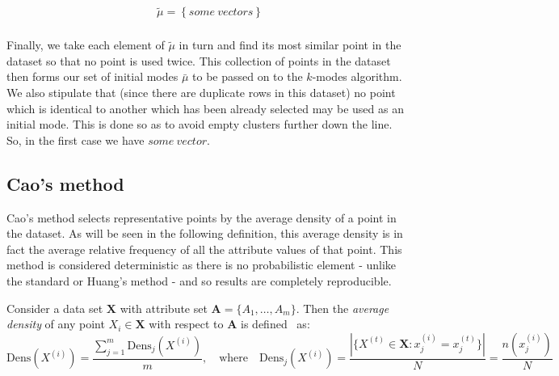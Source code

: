 \begin{example}
    \begin{equation}
    \nonumber
    \begin{aligned}
        \tilde{\mu} = \left\{some \ vectors \right\}\\
    \end{aligned}
    \end{equation}

    Finally, we take each element of \(\tilde{\mu}\) in turn and find its most
    similar point in the dataset so that no point is used twice. This collection
    of points in the dataset then forms our set of initial modes \(\bar{\mu}\)
    to be passed on to the \(k\)-modes algorithm. We also stipulate that (since
    there are duplicate rows in this dataset) no point which is identical to
    another which has been already selected may be used as an initial mode. This
    is done so as to avoid empty clusters further down the line.\\

    So, in the first case we have \(some \ vector\).

\end{example}

\subsection{Cao's method}\label{subsec:cao}

Cao's method selects representative points by the average density of a point in
the dataset. As will be seen in the following definition, this average density 
is in fact the average relative frequency of all the attribute values of that 
point. This method is considered deterministic as there is no probabilistic 
element - unlike the standard or Huang's method - and so results are completely
reproducible.\\

\begin{definition}\label{def:density}	
    Consider a data set \(\textbf{X}\) with attribute set \(\textbf{A} = 
    \{A_1, \ldots, A_m\}\). Then the \emph{average density} of any point 
    \(X_i \in \textbf{X}\) with respect to \(\textbf{A}\) is 
    defined~\cite{Cao09} as:
	\[
	    \text{Dens}(X^{(i)}) = \frac{\sum_{j=1}^m \text{Dens}_{j}(X^{(i)})}{m}, 
        \quad \text{where} \quad \text{Dens}_{j}(X^{(i)}) = \frac{|\{X^{(t)} \in 
        \textbf{X} : x_j^{(i)} = x_j^{(t)}\}|}{N} = \frac{n(x_j^{(i)})}{N}
	\]\\
\end{definition}

